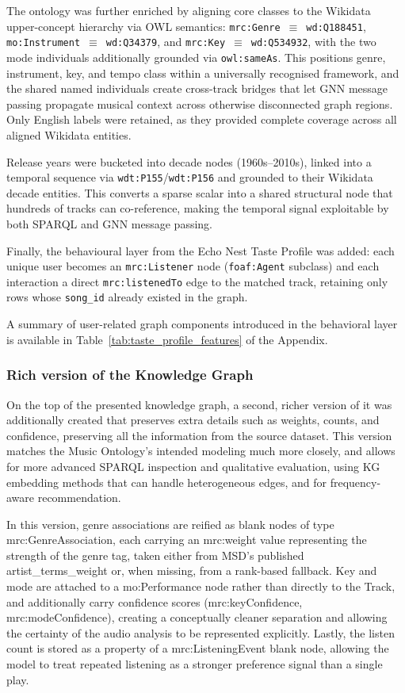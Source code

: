 The ontology was further enriched by aligning core classes to the Wikidata upper-concept hierarchy via OWL semantics: \texttt{mrc:Genre}~$\equiv$~\texttt{wd:Q188451}, \texttt{mo:Instrument}~$\equiv$~\texttt{wd:Q34379}, and \texttt{mrc:Key}~$\equiv$~\texttt{wd:Q534932}, with the two mode individuals additionally grounded via \texttt{owl:sameAs}. This positions genre, instrument, key, and tempo class within a universally recognised framework, and the shared named individuals create cross-track bridges that let GNN message passing propagate musical context across otherwise disconnected graph regions. Only English labels were retained, as they provided complete coverage across all aligned Wikidata entities.

Release years were bucketed into decade nodes (1960s--2010s), linked into a temporal sequence via \texttt{wdt:P155}/\texttt{wdt:P156} and grounded to their Wikidata decade entities. This converts a sparse scalar into a shared structural node that hundreds of tracks can co-reference, making the temporal signal exploitable by both SPARQL and GNN message passing.

Finally, the behavioural layer from the Echo Nest Taste Profile was added: each unique user becomes an \texttt{mrc:Listener} node (\texttt{foaf:Agent} subclass) and each interaction a direct \texttt{mrc:listenedTo} edge to the matched track, retaining only rows whose \texttt{song\_id} already existed in the graph.

A summary of user-related graph components introduced in the behavioral layer is available in Table~\ref{tab:taste_profile_features} of the Appendix.

\subsubsection{Rich version of the Knowledge Graph}

On the top of the presented knowledge graph, a second, richer version of it was additionally created that preserves extra details such as weights, counts, and confidence, preserving all the information from the source dataset. This version matches the Music Ontology's intended modeling much more closely, and allows for more advanced SPARQL inspection and qualitative evaluation, using KG embedding methods that can handle heterogeneous edges, and for frequency-aware recommendation. 

In this version, genre associations are reified as blank nodes of type mrc:GenreAssociation, each carrying an mrc:weight value representing the strength of the genre tag, taken either from MSD's published artist\_terms\_weight or, when missing, from a rank-based fallback. Key and mode are attached to a mo:Performance node rather than directly to the Track, and additionally carry confidence scores (mrc:keyConfidence, mrc:modeConfidence), creating a conceptually cleaner separation and allowing the certainty of the audio analysis to be represented explicitly. Lastly, the listen count is stored as a property of a mrc:ListeningEvent blank node, allowing the model to treat repeated listening as a stronger preference signal than a single play.

